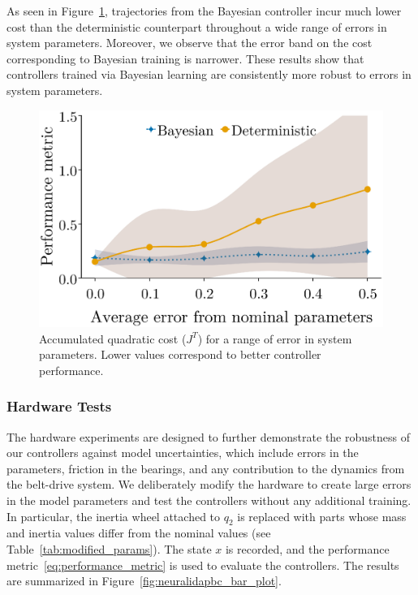 As seen in Figure~\ref{fig:comparison_idapbc}, trajectories from the Bayesian
controller incur much lower cost than the deterministic counterpart throughout a
wide range of errors in system parameters.
%
Moreover, we observe that the error band on the cost corresponding to Bayesian
training is narrower.
%
These results show that controllers trained via Bayesian learning are
consistently more robust to errors in system parameters.
\begin{figure}
    \centering
    \includegraphics[clip,width=0.6\columnwidth]{./figures/bandplot1.eps}%
    \caption{
        Accumulated quadratic cost ($J^T$) for a range of error in system
        parameters. 
        Lower values correspond to better controller performance.
    }
    \label{fig:comparison_idapbc}
\end{figure}

\subsubsection{Hardware Tests} 

The hardware experiments are designed to further demonstrate the robustness of our
controllers against model uncertainties, which include errors in the parameters,
friction in the bearings, and any contribution to the dynamics from the
belt-drive system.
%
We deliberately modify the hardware to create large errors in the model
parameters and test the controllers without any additional training.
%
In particular, the inertia wheel attached to $q_2$ is replaced with parts whose
mass and inertia values differ from the nominal values (see
Table~\ref{tab:modified_params}). The state $x$ is recorded, and the performance
metric~\eqref{eq:performance_metric} is used to evaluate the controllers.
%
The results are summarized in Figure~\ref{fig:neuralidapbc_bar_plot}.

